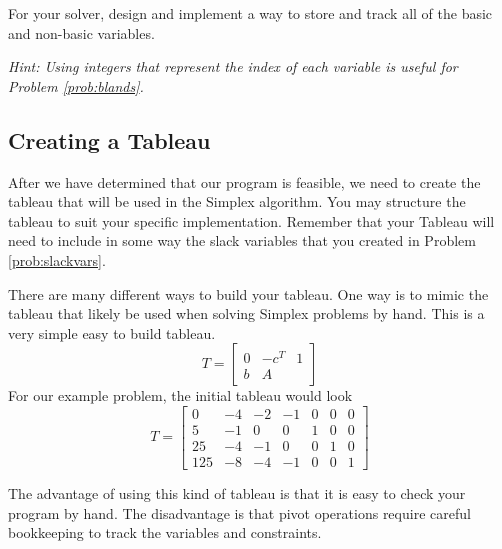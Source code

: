 \begin{problem}
For your solver, design and implement a way to store and track all of the basic and non-basic variables.

\emph{Hint: Using integers that represent the index of each variable is useful for Problem \ref{prob:blands}.}
\label{prob:slackvars}
\end{problem}

\subsection{Creating a Tableau}
After we have determined that our program is feasible, we need to create the tableau that will be used in the Simplex algorithm.
You may structure the tableau to suit your specific implementation.
Remember that your Tableau will need to include in some way the slack variables that you created in Problem \ref{prob:slackvars}.

There are many different ways to build your tableau.
One way is to mimic the tableau that likely be used when solving Simplex problems by hand.
This is a very simple easy to build tableau.
\begin{equation}
T = \begin{bmatrix}
    0 & -c^T & 1  \\
    b & A 
    \end{bmatrix}
\label{eqn:hand_tab}
\end{equation}
For our example problem, the initial tableau would look
\begin{equation*}
T = \begin{bmatrix}
    0 & -4 & -2 & -1 & 0 & 0 & 0 \\
    5 & -1 & 0 & 0 & 1 & 0 & 0 \\
    25 & -4 & -1 & 0 & 0 & 1 & 0 \\
    125 & -8 & -4 & -1 & 0 & 0 & 1
    \end{bmatrix}
\end{equation*}

The advantage of using this kind of tableau is that it is easy to check your program by hand.
The disadvantage is that pivot operations require careful bookkeeping to track the variables and constraints.

